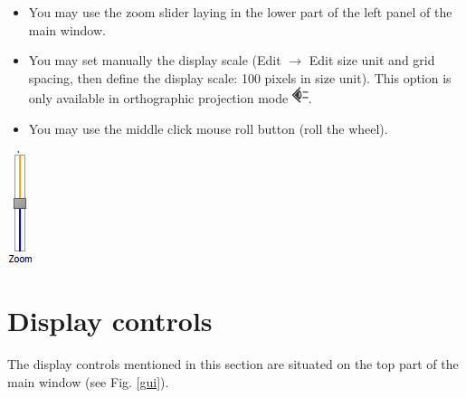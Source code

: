 \begin{minipage}{0.7\textwidth}
\begin{itemize}
\item You may use the zoom slider laying in the lower part of the left panel of the main window.
\item	You may set manually the display scale (Edit $\rightarrow$  Edit size unit and grid spacing, then define the display scale: 100 pixels in size unit). This option is only available in orthographic projection mode \includegraphics[scale=0.7]{images/06/camera/camera_ortho.png}.
\item	You may use the middle click mouse roll button (roll the wheel).
\end{itemize}
\end{minipage}    
\begin{minipage}{0.25\textwidth}\centering
  \includegraphics[scale=0.7]{images/06/camera/zoom_slider.png}


 \end{minipage}    


\section{Display controls}
The display controls mentioned in this section are situated on the top part of the main window (see Fig. \ref{gui}).


